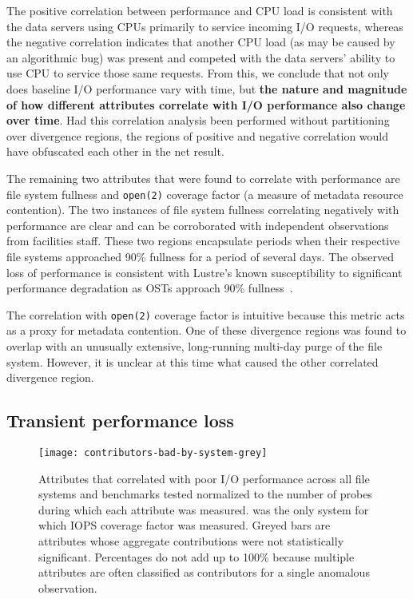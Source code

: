The positive correlation between performance and CPU load is consistent with the data servers using CPUs primarily to service incoming I/O requests, whereas the negative correlation indicates that another CPU load (as may be caused by an algorithmic bug) was present and competed with the data servers' ability to use CPU to service those same requests.
From this, we conclude that not only does baseline I/O performance vary with time, but \textbf{the nature and magnitude of how different attributes correlate with I/O performance also change over time}.
Had this correlation analysis been performed without partitioning over divergence regions, the regions of positive and negative correlation would have obfuscated each other in the net result.

The remaining two attributes that were found to correlate with performance
are file system fullness and \texttt{open(2)} coverage factor (a
measure of metadata resource contention).  The two instances of file
system fullness correlating negatively with performance are clear
and can be corroborated with independent observations from facilities
staff.  These two regions encapsulate periods when their respective
file systems approached 90\% fullness for a period of several days.
The observed loss of performance is consistent with Lustre's known
susceptibility to significant performance degradation as OSTs approach
90\% fullness~\cite{oral2014best,Lockwood2017}.

The correlation with
\texttt{open(2)} coverage factor is intuitive because this metric acts as a
proxy for metadata contention.  
One of these divergence regions was found to overlap with an unusually extensive, long-running multi-day purge of the \edison \scratchtwo file system.
However, it is unclear at this time what caused the other correlated divergence region.


\subsection{Transient performance loss} \label{sec:results/shortterm}

\begin{figure}

    \centering
    \texttt{[image: contributors-bad-by-system-grey]}
    \vspace{-.35in}
    \caption{Attributes that correlated with poor I/O performance across all file systems and benchmarks tested normalized to the number of probes during which each attribute was measured.
    \mira was the only system for which IOPS coverage factor was measured.
    Greyed bars are attributes whose aggregate contributions were not statistically significant.
    Percentages do not add up to 100\% because multiple attributes are often classified as contributors for a single anomalous observation.
    }
    \label{fig:contributors-bad-by-system}
\end{figure}

